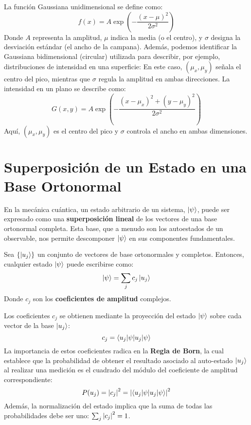 \documentclass{book}
\begin{document}
La función Gaussiana unidimensional se define como:
\begin{equation}
    f(x) = A \exp\left(-\frac{(x - \mu)^2}{2\sigma^2}\right)
    \label{eq:gaussiana1D}
\end{equation}
Donde $A$ representa la amplitud, $\mu$ indica la media (o el centro), y $\sigma$ designa la desviación estándar (el ancho de la campana). Además, podemos identificar la Gaussiana bidimensional (circular) utilizada para describir, por ejemplo, distribuciones de intensidad en una superficie:
En este caso, $(\mu_x, \mu_y)$ señala el centro del pico, mientras que $\sigma$ regula la amplitud en ambas direcciones.
La intensidad en un plano se describe como:
\begin{equation}
    G(x, y) = A \exp\left(-\frac{(x - \mu_x)^2 + (y - \mu_y)^2}{2\sigma^2}\right)
    \label{eq:gaussiana2D}
\end{equation}
Aquí, $(\mu_x, \mu_y)$ es el centro del pico y $\sigma$ controla el ancho en ambas dimensiones.

\section*{Superposición de un Estado en una Base Ortonormal}
\label{sec:superposicion_base}

En la mecánica cuántica, un estado arbitrario de un sistema, $\ket{\psi}$, puede ser expresado como una \textbf{superposición lineal} de los vectores de una base ortonormal completa. Esta base, que a menudo son los autoestados de un observable, nos permite descomponer $\ket{\psi}$ en sus componentes fundamentales.

Sea $\{\ket{u_j}\}$ un conjunto de vectores de base ortonormales y completos. Entonces, cualquier estado $\ket{\psi}$ puede escribirse como:
\begin{equation}
    \ket{\psi} = \sum_{j} c_j \ket{u_j}
    \label{eq:superposicion_general}
\end{equation}
Donde $c_j$ son los \textbf{coeficientes de amplitud} complejos.

Los coeficientes $c_j$ se obtienen mediante la proyección del estado $\ket{\psi}$ sobre cada vector de la base $\ket{u_j}$:
\begin{equation}
    c_j = \braket{u_j | \psi}
    \label{eq:coeficiente_amplitud}
\end{equation}
La importancia de estos coeficientes radica en la \textbf{Regla de Born}, la cual establece que la probabilidad de obtener el resultado asociado al auto-estado $\ket{u_j}$ al realizar una medición es el cuadrado del módulo del coeficiente de amplitud correspondiente:
\begin{equation}
    P(u_j) = \abs{c_j}^2 = \abs{\braket{u_j | \psi}}^2
    \label{eq:probabilidad_coeficiente}
\end{equation}
Además, la normalización del estado implica que la suma de todas las probabilidades debe ser uno: $\sum_j \abs{c_j}^2 = 1$.
\end{document}
